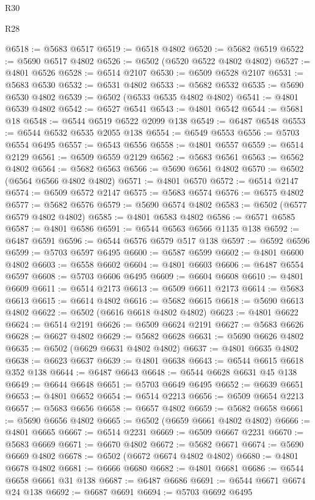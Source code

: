 \begin{lexlean}{R30}
\begin{lexlean}{R28}
\begin{coremodule}
{{{{{{{{{{{{{{{{{{{{{{{{{{{{{{{{{{{{{{{{{{{{{{{{{{{{{{{{{{{{{{{{{{{{{{{{{{{{{{{{{{{{{{{{{{{{{{{{{{{{{{{{{{{{{{{{{{{{{{{{{{{{{{{{{{{{{{{{{{{{{{{@6518 := @5683 @6517
@6519 := @6518 @4802
@6520 := @5682 @6519
@6522 := @5690 @6517 @4802
@6526 := @6502 (@6520 @6522 @4802 @4802)
@6527 := @4801 @6526
@6528 := @6514 @2107
@6530 := @6509 @6528 @2107
@6531 := @5683 @6530
@6532 := @6531 @4802
@6533 := @5682 @6532
@6535 := @5690 @6530 @4802
@6539 := @6502 (@6533 @6535 @4802 @4802)
@6541 := @4801 @6539 @4802
@6542 := @6527 @6541
@6543 := @4801 @6542
@6544 := @5681 @18
@6548 := @6544 @6519 @6522 @2099 @138
@6549 := @6487 @6548
@6553 := @6544 @6532 @6535 @2055 @138
@6554 := @6549 @6553
@6556 := @5703 @6554 @6495
@6557 := @6543 @6556
@6558 := @4801 @6557
@6559 := @6514 @2129
@6561 := @6509 @6559 @2129
@6562 := @5683 @6561
@6563 := @6562 @4802
@6564 := @5682 @6563
@6566 := @5690 @6561 @4802
@6570 := @6502 (@6564 @6566 @4802 @4802)
@6571 := @4801 @6570
@6572 := @6514 @2147
@6574 := @6509 @6572 @2147
@6575 := @5683 @6574
@6576 := @6575 @4802
@6577 := @5682 @6576
@6579 := @5690 @6574 @4802
@6583 := @6502 (@6577 @6579 @4802 @4802)
@6585 := @4801 @6583 @4802
@6586 := @6571 @6585
@6587 := @4801 @6586
@6591 := @6544 @6563 @6566 @1135 @138
@6592 := @6487 @6591
@6596 := @6544 @6576 @6579 @517 @138
@6597 := @6592 @6596
@6599 := @5703 @6597 @6495
@6600 := @6587 @6599
@6602 := @4801 @6600 @4802
@6603 := @6558 @6602
@6604 := @4801 @6603
@6606 := @6487 @6554 @6597
@6608 := @5703 @6606 @6495
@6609 := @6604 @6608
@6610 := @4801 @6609
@6611 := @6514 @2173
@6613 := @6509 @6611 @2173
@6614 := @5683 @6613
@6615 := @6614 @4802
@6616 := @5682 @6615
@6618 := @5690 @6613 @4802
@6622 := @6502 (@6616 @6618 @4802 @4802)
@6623 := @4801 @6622
@6624 := @6514 @2191
@6626 := @6509 @6624 @2191
@6627 := @5683 @6626
@6628 := @6627 @4802
@6629 := @5682 @6628
@6631 := @5690 @6626 @4802
@6635 := @6502 (@6629 @6631 @4802 @4802)
@6637 := @4801 @6635 @4802
@6638 := @6623 @6637
@6639 := @4801 @6638
@6643 := @6544 @6615 @6618 @352 @138
@6644 := @6487 @6643
@6648 := @6544 @6628 @6631 @45 @138
@6649 := @6644 @6648
@6651 := @5703 @6649 @6495
@6652 := @6639 @6651
@6653 := @4801 @6652
@6654 := @6514 @2213
@6656 := @6509 @6654 @2213
@6657 := @5683 @6656
@6658 := @6657 @4802
@6659 := @5682 @6658
@6661 := @5690 @6656 @4802
@6665 := @6502 (@6659 @6661 @4802 @4802)
@6666 := @4801 @6665
@6667 := @6514 @2231
@6669 := @6509 @6667 @2231
@6670 := @5683 @6669
@6671 := @6670 @4802
@6672 := @5682 @6671
@6674 := @5690 @6669 @4802
@6678 := @6502 (@6672 @6674 @4802 @4802)
@6680 := @4801 @6678 @4802
@6681 := @6666 @6680
@6682 := @4801 @6681
@6686 := @6544 @6658 @6661 @31 @138
@6687 := @6487 @6686
@6691 := @6544 @6671 @6674 @24 @138
@6692 := @6687 @6691
@6694 := @5703 @6692 @6495
}}}}}}}}}}}}}}}}}}}}}}}}}}}}}}}}}}}}}}}}}}}}}}}}}}}}}}}}}}}}}}}}}}}}}}}}}}}}}}}}}}}}}}}}}}}}}}}}}}}}}}}}}}}}}}}}}}}}}}}}}}}}}}}}}}}}}}}}}}}}}}}
\end{coremodule}
\end{lexlean}
\end{lexlean}
